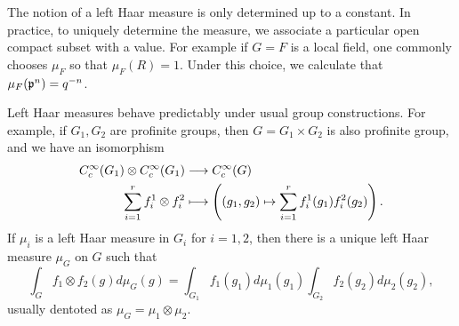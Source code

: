 \begin{example}
    The notion of a left Haar measure is only determined up to a constant. In practice, to uniquely determine the measure, we associate a particular open compact subset with a value. For example if $G=F$ is a local field, one commonly chooses $\mu_F$ so that $\mu_F(R)=1$. Under this choice, we calculate that $\mu_F(\mathfrak{p}^n)=q^{-n}$.
\end{example}

Left Haar measures behave predictably under usual group constructions. For example, if $G_1,G_2$ are profinite groups, then $G=G_1\times G_2$ is also profinite group, and we have an isomorphism 
\begin{align*}
    C_c^{\infty}(G_1)\otimes C_c^{\infty}(G_1)&\longrightarrow C_c^{\infty}(G)\\
    \sum_{i=1}^{r}f_i^1\otimes f_i^2 &\longmapsto \left((g_1,g_2)\mapsto \sum_{i=1}^{r}f_i^1(g_1)f_i^2(g_2)\right).
\end{align*}
If $\mu_i$ is a left Haar measure in $G_i$ for $i=1,2$, then there is a unique left Haar measure $\mu_G$ on $G$ such that 
$$\int_G f_1\otimes f_2(g)d\mu_G(g)=\int_{G_1}f_1(g_1)d\mu_1(g_1)\int_{G_2}f_2(g_2)d\mu_2(g_2),$$
usually dentoted as $\mu_G=\mu_1\otimes\mu_2$.



